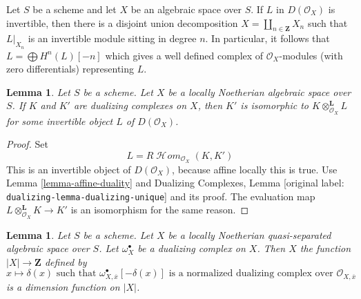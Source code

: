 \documentclass[10pt,a4paper]{article}
\theoremstyle{plain}
\newtheorem{lemma}[subsection]{Lemma}
\theoremstyle{definition}
\theoremstyle{remark}
\numberwithin{equation}{subsection}
\def\SheafHom{\mathop{\mathcal{H}\!\mathit{om}}\nolimits}
\begin{document}
\medskip\noindent
Let $S$ be a scheme and let $X$ be an algebraic space over $S$.
If $L$ in $D(\mathcal{O}_X)$ is invertible, then there is a
disjoint union decomposition $X = \coprod_{n \in \mathbf{Z}} X_n$
such that $L|_{X_n}$ is an invertible module sitting in degree $n$.
In particular, it follows that $L = \bigoplus H^n(L)[-n]$
which gives a well defined complex of $\mathcal{O}_X$-modules
(with zero differentials) representing $L$.

\begin{lemma}
\label{lemma-dualizing-unique-spaces}
Let $S$ be a scheme.
Let $X$ be a locally Noetherian algebraic space over $S$.
If $K$ and $K'$ are dualizing complexes on $X$, then $K'$
is isomorphic to $K \otimes_{\mathcal{O}_X}^\mathbf{L} L$
for some invertible object $L$ of $D(\mathcal{O}_X)$.
\end{lemma}

\begin{proof}
Set
$$
L = R\SheafHom_{\mathcal{O}_X}(K, K')
$$
This is an invertible object of $D(\mathcal{O}_X)$, because affine locally
this is true. Use Lemma \ref{lemma-affine-duality} and
Dualizing Complexes, Lemma
\textnormal{[original label: \nolinkurl{dualizing-lemma-dualizing-unique}]} and its proof.
The evaluation map $L \otimes_{\mathcal{O}_X}^\mathbf{L} K \to K'$
is an isomorphism for the same reason.
\end{proof}

\begin{lemma}
\label{lemma-dimension-function-scheme}
Let $S$ be a scheme. Let $X$ be a locally Noetherian
quasi-separated algebraic space over $S$.
Let $\omega_X^\bullet$ be a dualizing complex on $X$. Then $X$ the function
$|X| \to \mathbf{Z}$ defined by
$$
x \longmapsto \delta(x)\text{ such that }
\omega_{X, \overline{x}}^\bullet[-\delta(x)]
\text{ is a normalized dualizing complex over }
\mathcal{O}_{X, \overline{x}}
$$
is a dimension function on $|X|$.
\end{lemma}
\end{document}
